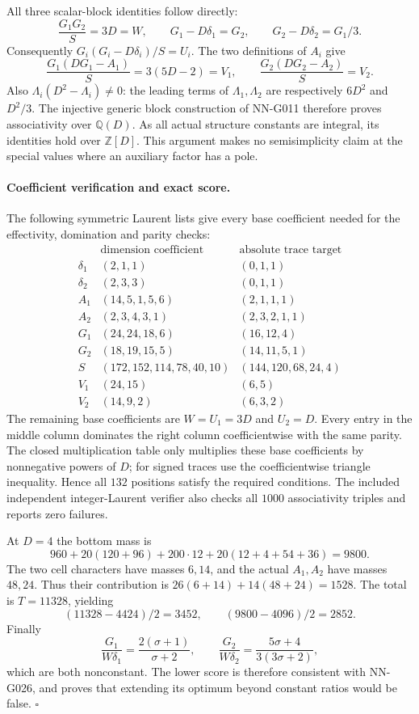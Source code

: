 All three scalar-block identities follow directly:
\[
 \frac{G_1G_2}{S}=3D=W,\qquad
 G_1-D\delta_1=G_2,\qquad
 G_2-D\delta_2=G_1/3.
\]
Consequently $G_i(G_i-D\delta_i)/S=U_i$.
The two definitions of $A_i$ give
\[
 \frac{G_1(DG_1-A_1)}S=3(5D-2)=V_1,\qquad
 \frac{G_2(DG_2-A_2)}S=V_2.
\]
Also $\Lambda_i(D^2-\Lambda_i)\ne0$: the leading
terms of $\Lambda_1,\Lambda_2$ are respectively
$6D^2$ and $D^2/3$. The injective generic block
construction of NN-G011 therefore proves associativity
over $\mathbb Q(D)$. As all actual structure constants
are integral, its identities hold over $\mathbb Z[D]$.
This argument makes no semisimplicity claim at the
special values where an auxiliary factor has a pole.

\paragraph{Coefficient verification and exact score.}
The following symmetric Laurent lists give every base
coefficient needed for the effectivity, domination and
parity checks:
\[
\begin{array}{c|l|l}
 &\text{dimension coefficient}&\text{absolute trace target}\\\hline
 \delta_1&(2,1,1)&(0,1,1)\\
 \delta_2&(2,3,3)&(0,1,1)\\
 A_1&(14,5,1,5,6)&(2,1,1,1)\\
 A_2&(2,3,4,3,1)&(2,3,2,1,1)\\
 G_1&(24,24,18,6)&(16,12,4)\\
 G_2&(18,19,15,5)&(14,11,5,1)\\
 S&(172,152,114,78,40,10)&(144,120,68,24,4)\\
 V_1&(24,15)&(6,5)\\
 V_2&(14,9,2)&(6,3,2)
\end{array}                                                         \tag{G027.2}
\]
The remaining base coefficients are $W=U_1=3D$ and
$U_2=D$. Every entry in the middle column dominates
the right column coefficientwise with the same parity.
The closed multiplication table only multiplies these
base coefficients by nonnegative powers of $D$;
for signed traces use the coefficientwise triangle
inequality. Hence all $132$ positions satisfy the
required conditions. The included independent
integer-Laurent verifier also checks all $1000$
associativity triples and reports zero failures.

At $D=4$ the bottom mass is
\[
 960+20(120+96)+200\cdot12+20(12+4+54+36)=9800.
\]
The two cell characters have masses $6,14$, and the
actual $A_1,A_2$ have masses $48,24$. Thus their
contribution is $26(6+14)+14(48+24)=1528$.
The total is $T=11328$, yielding
\[
 (11328-4424)/2=3452,\qquad (9800-4096)/2=2852.
 \tag{G027.3}
\]
Finally
\[
 \frac{G_1}{W\delta_1}=\frac{2(\sigma+1)}{\sigma+2},
 \qquad
 \frac{G_2}{W\delta_2}=\frac{5\sigma+4}{3(3\sigma+2)},
\]
which are both nonconstant. The lower score is therefore
consistent with NN-G026, and proves that extending
its optimum beyond constant ratios would be false.
\hfill$\square$

